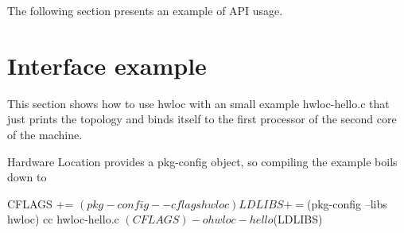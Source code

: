 The following section presents an example of API usage.\hypertarget{index_interface_example}{}\section{Interface example}\label{index_interface_example}
This section shows how to use hwloc with an small example {\ttfamily hwloc-\/hello.c} that just prints the topology and binds itself to the first processor of the second core of the machine.

Hardware Location provides a pkg-\/config object, so compiling the example boils down to

\begin{DoxyVerb}
CFLAGS += $(pkg-config --cflags hwloc)
LDLIBS += $(pkg-config --libs hwloc)
cc hwloc-hello.c $(CFLAGS) -o hwloc-hello $(LDLIBS)
\end{DoxyVerb}



